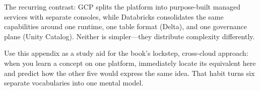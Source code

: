 \noindent The recurring contrast: GCP splits the platform into purpose-built managed services with
separate consoles, while Databricks consolidates the same capabilities around one runtime, one
table format (Delta), and one governance plane (Unity Catalog). Neither is simpler---they
distribute complexity differently.

\begin{tipbox}
Use this appendix as a study aid for the book's lockstep, cross-cloud approach: when you learn a
concept on one platform, immediately locate its equivalent here and predict how the other five
would express the same idea. That habit turns six separate vocabularies into one mental model.
\end{tipbox}
